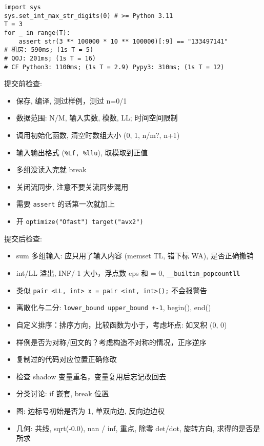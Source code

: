 \begin{small}
\begin{itemize}[leftmargin=1mm]
\begin{verbatim}
\end{verbatim}
\begin{verbatim}
import sys
sys.set_int_max_str_digits(0) # >= Python 3.11 
T = 3
for _ in range(T):
    assert str(3 ** 100000 * 10 ** 100000)[:9] == "133497141"
# 机房: 590ms; (1s T = 5)
# QOJ: 201ms; (1s T = 16)
# CF Python3: 1100ms; (1s T = 2.9) Pypy3: 310ms; (1s T = 12)
\end{verbatim}
\end{itemize}
提交前检查: 
\begin{itemize}[leftmargin=1mm]
    \setlength{\itemsep}{0pt}
    \setlength{\parskip}{0.5pt}
\item 保存, 编译, 测过样例，测过 n=0/1
\item 数据范围: N/M, 输入实数, 模数, LL; 时间空间限制
\item 调用初始化函数, 清空时数组大小 (0, 1, n/m?, n+1)
\item 输入输出格式 (\texttt{\%Lf, \%llu}), 取模取到正值
\item 多组没读入完就 break
\item 关闭流同步, 注意不要关流同步混用
\item 需要 \texttt{assert} 的话第一次就加上
\item 开 \texttt{optimize("Ofast") target("avx2")}
\end{itemize}
提交后检查:
\begin{itemize}[leftmargin=1mm]
\setlength{\itemsep}{0pt}
\setlength{\parskip}{0.5pt}
\item sum 多组输入: 应只用了输入内容 (memset TL, 错下标 WA), 是否正确撤销
\item int/LL 溢出, INF/-1 大小，浮点数 eps 和 = 0, \texttt{\_\_builtin\_popcount\textbf{ll}}
\item 类似 \texttt{pair <LL, int> x = pair <int, int>();} 不会报警告 
\item 离散化与二分: \texttt{lower\_bound upper\_bound +-1}, begin(), end()
\item 自定义排序：排序方向，比较函数为小于，考虑坏点: 如叉积 (0, 0)
\item 样例是否为对称/回文的？考虑构造不对称的情况，正序逆序
\item 复制过的代码对应位置正确修改
\item 检查 shadow 变量重名，变量复用后忘记改回去
\item 分类讨论: if 嵌套, break 位置
\item 图: 边标号初始是否为 1, 单双向边, 反向边边权
\item 几何: 共线, sqrt(-0.0), nan / inf, 重点, 除零 det/dot, 旋转方向, 求得的是否是所求
\end{itemize}
\end{small}